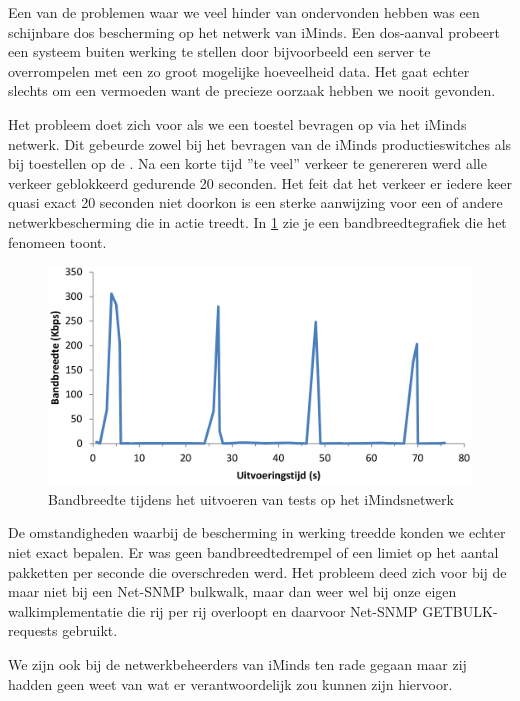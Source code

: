 
Een van de problemen waar we veel hinder van ondervonden hebben was een schijnbare \gls{dos} bescherming op het netwerk van iMinds.
Een \gls{dos}-aanval probeert een systeem buiten werking te stellen door bijvoorbeeld een server te overrompelen met een zo groot mogelijke hoeveelheid data.
Het gaat echter slechts om een vermoeden want de precieze oorzaak hebben we nooit gevonden.

Het probleem doet zich voor als we een toestel bevragen op via het iMinds netwerk.
Dit gebeurde zowel bij het bevragen van de iMinds productieswitches als bij toestellen op de \vwall{}.
Na een korte tijd ''te veel'' verkeer te genereren werd alle verkeer geblokkeerd gedurende 20 seconden.
Het feit dat het verkeer er iedere keer quasi exact 20 seconden niet doorkon is een sterke aanwijzing voor een of andere netwerkbescherming die in actie treedt.
In \cref{fig-dos-bescherming} zie je een bandbreedtegrafiek die het fenomeen toont.

\begin{figure}[h]
	\centering
	\includegraphics[scale=0.40]{figures/dos-bescherming}
	\caption{Bandbreedte tijdens het uitvoeren van tests op het iMindsnetwerk}
	\label{fig-dos-bescherming}
\end{figure}

De omstandigheden waarbij de bescherming in werking treedde konden we echter niet exact bepalen.
Er was geen bandbreedtedrempel of een limiet op het aantal pakketten per seconde die overschreden werd.
Het probleem deed zich voor bij de \nwmretriever{} maar niet bij een Net-SNMP bulkwalk,
maar dan weer wel bij onze eigen walkimplementatie die rij per rij overloopt en daarvoor Net-SNMP GETBULK-requests gebruikt.

We zijn ook bij de netwerkbeheerders van iMinds ten rade gegaan maar zij hadden geen weet van wat er verantwoordelijk zou kunnen zijn hiervoor.

